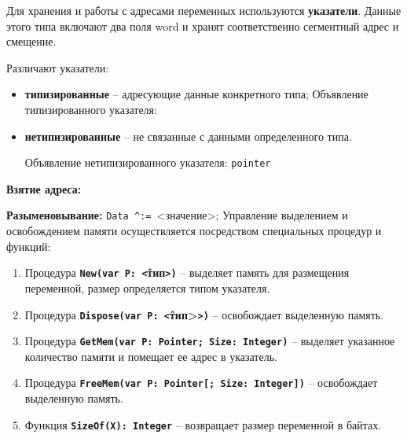 
Для хранения и работы с адресами переменных используются {\bf{указатели}}. Данные этого типа включают два поля word и хранят соответственно сегментный адрес и смещение.

\noindent
Различают указатели: 

\begin{itemize}
\item {\bf{типизированные}} – адресующие данные конкретного типа;
\noindent
Объявление типизированного указателя:


\item {\bf{нетипизированные}} – не связанные с данными определенного типа.

\noindent
Объявление нетипизированного указателя: \texttt{pointer}
\end{itemize}

\noindent
{\bf Взятие адреса:}
 

\noindent
{\bf Разыменовывание: }
\texttt{Data \textasciicircum  := }<значение>;
\newpage
Управление выделением и освобождением памяти осуществляется посредством специальных процедур и функций:

\begin{enumerate}

    \item Процедура {\bf \texttt{New(var P: \^<}тип\texttt{>)}} – выделяет память для размещения переменной, размер определяется типом указателя.
    \item Процедура {\bf \texttt{Dispose(var P: \^<}тип>\texttt{>)}} – освобождает выделенную память.
    \item Процедура {\bf \texttt{GetMem(var P: Pointer; Size: Integer)}} – выделяет указанное количество памяти и помещает ее адрес в указатель.
    \item Процедура {\bf \texttt{FreeMem(var P: Pointer[; Size: Integer])}} – освобождает выделенную память.
    \item Функция {\bf \texttt{SizeOf(X): Integer}} – возвращает размер переменной в байтах.

\end{enumerate}








